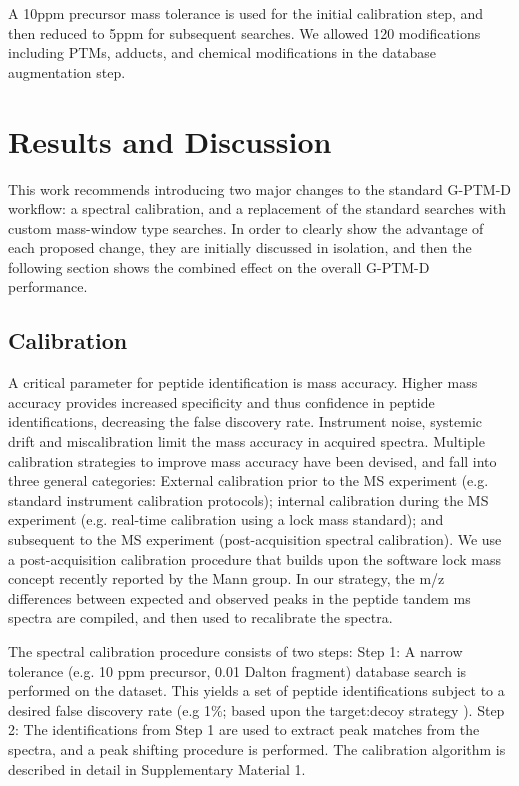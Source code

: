 \documentclass[journal=jprobs,manuscript=article]{achemso}
\begin{document}
A 10ppm precursor mass tolerance is used for the initial calibration step, and then reduced to 5ppm for subsequent searches.
We allowed 120 modifications including PTMs, adducts, and chemical modifications in the database augmentation step.

\section{Results and Discussion}

This work recommends introducing two major changes to the standard G-PTM-D workflow: a spectral calibration, and a replacement of the standard searches with custom mass-window type searches.
In order to clearly show the advantage of each proposed change, they are initially discussed in isolation, and then the following section shows the combined effect on the overall G-PTM-D performance.

\subsection{Calibration}

A critical parameter for peptide identification is mass accuracy\cite{Scherl_2008}.
Higher mass accuracy provides increased specificity and thus confidence in peptide identifications, decreasing the false discovery rate.
Instrument noise, systemic drift and miscalibration limit the mass accuracy in acquired spectra.
Multiple calibration strategies to improve mass accuracy have been devised, and fall into three general categories:  External calibration prior to the MS experiment (e.g. standard instrument calibration protocols); internal calibration during the MS experiment (e.g. real-time calibration using a lock mass standard\cite{Olsen_2005}); and subsequent to the MS experiment (post-acquisition spectral calibration).
We use a post-acquisition calibration procedure that builds upon the software lock mass concept\cite{Cox_2011} recently reported by the Mann group.
In our strategy, the m/z differences between expected and observed peaks in the peptide tandem ms spectra are compiled, and then used to recalibrate the spectra.

The spectral calibration procedure consists of two steps: Step 1: A narrow tolerance (e.g. 10 ppm precursor, 0.01 Dalton fragment) database search is performed on the dataset.
This yields a set of peptide identifications subject to a desired false discovery rate (e.g 1\%; based upon the target:decoy strategy \cite{Elias_2007}).
Step 2: The identifications from Step 1 are used to extract peak matches from the spectra, and a peak shifting procedure is performed.
The calibration algorithm is described in detail in Supplementary Material 1.
\end{document}
